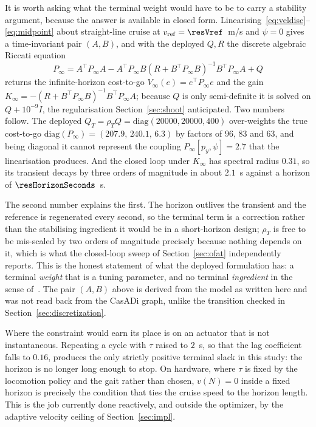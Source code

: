 \documentclass[11pt,a4paper]{article}
\begin{document}
It is worth asking what the terminal weight would have to be to carry a stability argument, because the
answer is available in closed form. Linearising~\eqref{eq:veldisc}--\eqref{eq:midpoint} about straight-line
cruise at $v_{\mathrm{ref}}=\resVref$~m/s and $\psi=0$ gives a time-invariant pair $(A,B)$, and with the
deployed $Q,R$ the discrete algebraic Riccati equation
\begin{equation}
  P_\infty = A^{\!\top}P_\infty A
           - A^{\!\top}P_\infty B\left(R+B^{\!\top}P_\infty B\right)^{-1}B^{\!\top}P_\infty A + Q
  \label{eq:dare}
\end{equation}
returns the infinite-horizon cost-to-go $V_\infty(e)=e^{\!\top}P_\infty e$ and the gain
$K_\infty=-(R+B^{\!\top}P_\infty B)^{-1}B^{\!\top}P_\infty A$; because $Q$ is only semi-definite it is
solved on $Q+10^{-9}I$, the regularisation Section~\ref{sec:shoot} anticipated. Two numbers follow. The
deployed $Q_T=\rho_T Q=\mathrm{diag}(20000,20000,400)$ over-weights the true cost-to-go
$\mathrm{diag}(P_\infty)=(207.9,\,240.1,\,6.3)$ by factors of $96$, $83$ and $63$, and being diagonal it
cannot represent the coupling $P_\infty[p_y,\psi]=2.7$ that the linearisation produces. And the closed loop
under $K_\infty$ has spectral radius $0.31$, so its transient decays by three orders of magnitude in about
$2.1$~s against a horizon of $\resHorizonSeconds$~s.

The second number explains the first. The horizon outlives the transient and the reference is regenerated
every second, so the terminal term is a correction rather than the stabilising ingredient it would be in a
short-horizon design; $\rho_T$ is free to be mis-scaled by two orders of magnitude precisely because
nothing depends on it, which is what the closed-loop sweep of Section~\ref{sec:ofat} independently
reports. This is the honest statement of what the deployed formulation has: a terminal \emph{weight} that
is a tuning parameter, and no terminal \emph{ingredient} in the sense
of~\cite{mayne2000constrained,chen1998quasi}. The pair $(A,B)$ above is derived from the model as written
here and was not read back from the CasADi graph, unlike the transition checked in
Section~\ref{sec:discretization}.

Where the constraint would earn its place is on an actuator that is not instantaneous. Repeating a cycle
with $\tau$ raised to $2$~s, so that the lag coefficient falls to $0.16$, produces the only strictly positive
terminal slack in this study: the horizon is no longer long enough to stop. On hardware, where $\tau$ is fixed by the locomotion policy and the gait
rather than chosen, $v(N)=0$ inside a fixed horizon is precisely the condition that ties the cruise speed to
the horizon length. This is the job currently done reactively, and outside the optimizer, by the adaptive
velocity ceiling of Section~\ref{sec:impl}.
\end{document}
